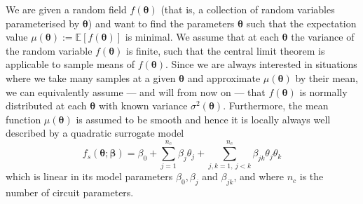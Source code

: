 \documentclass[aps,prb,twoside,superscriptaddress,longbibliography,nofootinbib,floatfix, notitlepage,twocolumn]{revtex4-1}
\renewcommand{\vec}[1]{\boldsymbol{#1}}
\begin{document}
We are given a random field $f(\vec\theta)$ (that is, a collection of random variables parameterised by $\vec\theta$) and want to find the parameters 
$\vec\theta$ such that the expectation value
$\mu(\vec\theta) := \mathds{E}[f(\vec\theta)]$ is minimal. We assume that
at each $\vec\theta$ the variance of the random variable $f(\vec\theta)$ is finite, such that the central limit theorem is applicable to sample means of $f(\vec\theta)$.
Since we are always interested in situations where we take many samples at a given 
$\vec\theta$ and approximate $\mu(\vec\theta)$ by their mean, we can equivalently assume
--- and will from now on ---
that $f(\vec\theta)$ is normally distributed at each $\vec\theta$ with known variance
$\sigma^2(\vec\theta)$.
Furthermore, the mean function $\mu(\vec\theta)$ is assumed to be smooth and hence 
it is locally always well described by a quadratic surrogate model 
\begin{equation}
  f_s(\vec\theta; \vec\beta) = \beta_0
                             + \sum_{j=1}^{n_c} \beta_j \theta_j
                             + \sum_{j,k=1,~j<k}^{n_c} \beta_{jk} \theta_j \theta_k
  \label{eq:surrogate_model}
\end{equation}
which is linear in its model parameters $\beta_0, \beta_j$ and $\beta_{jk}$, and where $n_c$ is the number of circuit parameters.
\end{document}
